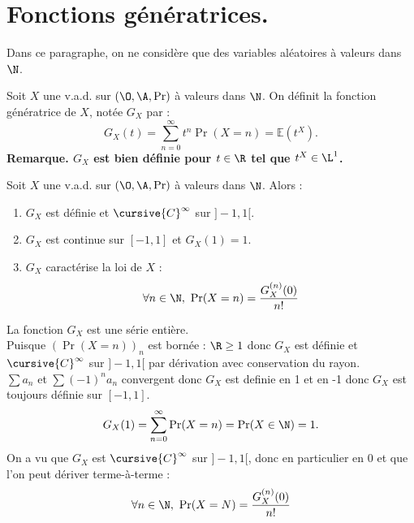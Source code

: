 \documentclass[11pt]{article}
\renewcommand*{\E}{\mathbb{E}}
\begin{document}
\pagebreak      

\section{Fonctions génératrices.}

Dans ce paragraphe, on ne considère que des variables aléatoires à valeurs dans $\N$.

\begin{defi}{}{}
    Soit $X$ une v.a.d. sur $(\O,\A,\Pr)$ à valeurs dans $\N$. On définit la fonction génératrice de $X$, notée $G_X$ par :
    \begin{equation*}
        G_X(t) = \sum_{n=0}^{\infty} t^n\Pr(X=n) = \E(t^X).
    \end{equation*}
    \bf{Remarque.} $G_X$ est bien définie pour $t\in\R$ tel que $t^X\in\L^1$.
\end{defi}

\begin{prop}{}{}
    Soit $X$ une v.a.d. sur $(\O,\A,\Pr)$ à valeurs dans $\N$. Alors :
    \begin{enumerate}
        \item $G_X$ est définie et $\cursive{C}^\infty$ sur $]-1,1[$.
        \item $G_X$ est continue sur $[-1,1]$ et $G_X(1)=1$.
        \item $G_X$ caractérise la loi de $X$ :
        \begin{equation*} \forall n \in \N, ~ \Pr(X=n) = \frac{G_X^{(n)}(0)}{n!} \end{equation*}
    \end{enumerate}
    \tcblower
    La fonction $G_X$ est une série entière.\\
     Puisque $(\Pr(X=n))_n$ est bornée : $\R\geq 1$ donc $G_X$ est définie et $\cursive{C}^\infty$ sur $]-1,1[$ par dérivation avec conservation du rayon.\\
     $\sum a_n$ et $\sum (-1)^na_n$ convergent donc $G_X$ est definie en 1 et en -1 donc $G_X$ est toujours définie sur $[-1,1]$.
    \begin{equation*}
        G_X(1) = \sum_{n=0}^{\infty} \Pr(X=n) = \Pr(X\in\N) = 1.
    \end{equation*}
     On a vu que $G_X$ est $\cursive{C}^\infty$ sur $]-1,1[$, donc en particulier en 0 et que l'on peut dériver terme-à-terme :
    \begin{equation*}
        \forall n \in \N, ~ \Pr(X=N) = \frac{G_X^{(n)}(0)}{n!}
    \end{equation*}
\end{prop}
\end{document}
